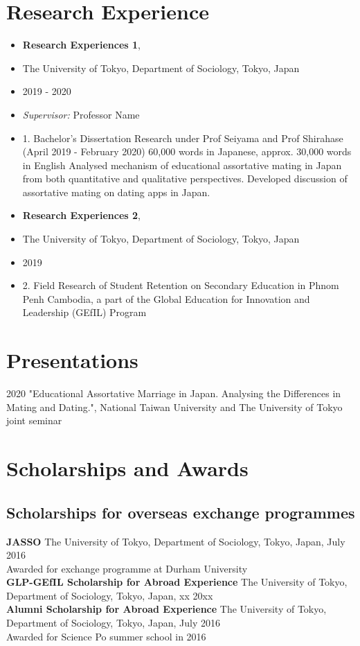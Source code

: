 \documentclass[11pt, a4paper]{article}
\begin{document}
\section*{Research Experience}
\begin{itemize}[leftmargin=*]
    \item \textbf{Research Experiences 1}, \\
    \item The University of Tokyo, Department of Sociology, Tokyo, Japan \\
    \item 2019 - 2020 \\
    \item \textit{Supervisor:} Professor Name \\
    \item 1. Bachelor’s Dissertation Research under Prof Seiyama and Prof Shirahase (April 2019 - February 2020)
    60,000 words in Japanese, approx. 30,000 words in English
    Analysed mechanism of educational assortative mating in Japan from both quantitative and qualitative perspectives.
    Developed discussion of assortative mating on dating apps in Japan.
    \item \textbf{Research Experiences 2}, \\
    \item The University of Tokyo, Department of Sociology, Tokyo, Japan \\
    \item 2019 \\
    \item 2. Field Research of Student Retention on Secondary Education in Phnom Penh Cambodia, a part of the Global Education for Innovation and Leadership (GEfIL) Program
\end{itemize}

\section*{Presentations}
2020 "Educational Assortative Marriage in Japan. Analysing the Differences in Mating and Dating.", National Taiwan University and The University of Tokyo joint seminar

\section*{Scholarships and Awards}
\subsection*{Scholarships for overseas exchange programmes}
\textbf{JASSO}
The University of Tokyo, Department of Sociology, Tokyo, Japan, July 2016 \\
Awarded for exchange programme at Durham University \\
\textbf{GLP-GEfIL Scholarship for Abroad Experience}
The University of Tokyo, Department of Sociology, Tokyo, Japan, xx 20xx \\
\textbf{Alumni Scholarship for Abroad Experience}
The University of Tokyo, Department of Sociology, Tokyo, Japan, July 2016 \\
Awarded for Science Po summer school in 2016 \\
\end{document}
